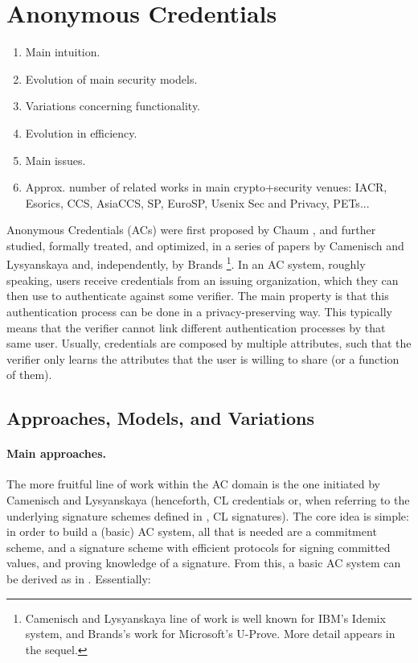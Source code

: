 \section{Anonymous Credentials}
\label{sec:ac}


\begin{enumerate}
\item Main intuition.
\item Evolution of main security models.
\item Variations concerning functionality.
\item Evolution in efficiency.
\item Main issues.
\item Approx. number of related works in main crypto+security venues: IACR,
  Esorics, CCS, AsiaCCS, SP, EuroSP, Usenix Sec and Privacy, PETs...
\end{enumerate}

Anonymous Credentials (ACs) were first proposed by Chaum \cite{chau85}, and
further studied, formally treated, and optimized, in a series of papers by
Camenisch and Lysyanskaya \cite{cl01,cl02,cl04} and, independently, by Brands
\needcite\footnote{Camenisch and Lysyanskaya line of work is well known for
  IBM's Idemix system, and Brands's work for Microsoft's U-Prove. More detail
  appears in the sequel.}. In an AC system, roughly speaking, users receive
credentials from an issuing organization, which they can then use to
authenticate against some verifier. The main property is that this
authentication process can be done in a privacy-preserving way. This typically
means that the verifier cannot link different authentication processes by that
same user. Usually, credentials are composed by multiple attributes, such that
the verifier only learns the attributes that the user is willing to share (or a
function of them).

\subsection{Approaches, Models, and Variations}

\paragraph{Main approaches.} %
The more fruitful line of work within the AC domain is the one initiated by
Camenisch and Lysyanskaya \cite{cl01,cl02,cl04} (henceforth, CL credentials or,
when referring to the underlying signature schemes defined in \cite{cl02,cl04},
CL signatures). The core idea is simple: in order to build a (basic) AC
system, all that is needed are a commitment scheme, and a signature scheme
with efficient protocols for signing committed values, and proving knowledge
of a signature. From this, a basic AC system can be derived as in .
Essentially:

